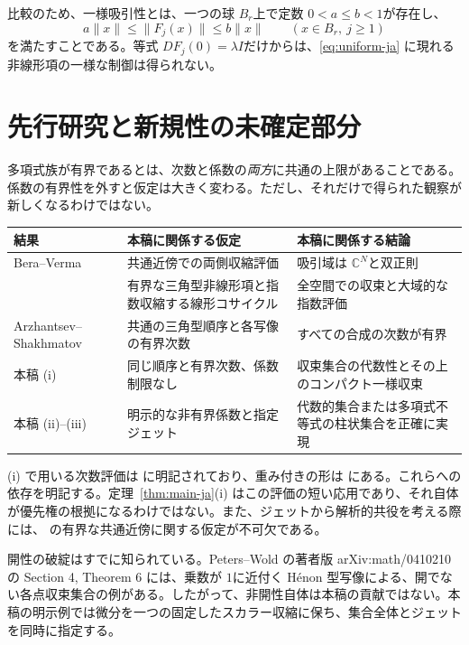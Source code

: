 \documentclass[12pt]{amsart}
\theoremstyle{definition}
\theoremstyle{remark}
\numberwithin{equation}{section}
\newcommand{\C}{\mathbb{C}}
\begin{document}
比較のため、一様吸引性とは、一つの球 \allowbreak$B_r$\allowbreak 上で定数 \allowbreak$0<a\leq b<1$\allowbreak が存在し、
\begin{equation}\label{eq:uniform-ja}
a\|x\|\leq\|F_j(x)\|\leq b\|x\|
\qquad(x\in B_r,\ j\geq1)
\end{equation}
を満たすことである。等式 \allowbreak$DF_j(0)=\lambda I$\allowbreak だけからは、\eqref{eq:uniform-ja} に現れる非線形項の一様な制御は得られない。

\section{先行研究と新規性の未確定部分}
多項式族が有界であるとは、次数と係数の\emph{両方}に共通の上限があることである。係数の有界性を外すと仮定は大きく変わる。ただし、それだけで得られた観察が新しくなるわけではない。

\begin{center}
\small
\begin{tabular}{p{2.55cm}|p{5.05cm}|p{5.4cm}}
結果 & 本稿に関係する仮定 & 本稿に関係する結論\\\hline
Bera--Verma & 共通近傍での両側収縮評価 & 吸引域は \allowbreak$\C^N$\allowbreak と双正則\\
\cite{AAM-ja} & 有界な三角型非線形項と指数収縮する線形コサイクル & 全空間での収束と大域的な指数評価\\
Arzhantsev--Shakhmatov & 共通の三角型順序と各写像の有界次数 & すべての合成の次数が有界\\
本稿 (i) & 同じ順序と有界次数、係数制限なし & 収束集合の代数性とその上のコンパクト一様収束\\
本稿 (ii)--(iii) & 明示的な非有界係数と指定ジェット & 代数的集合または多項式不等式の柱状集合を正確に実現
\end{tabular}
\end{center}

(i) で用いる次数評価は \cite[Lemma 1]{AS-ja} に明記されており、重み付きの形は \cite[Lemma 6.2]{AAM-ja} にある。これらへの依存を明記する。定理~\ref{thm:main-ja}(i) はこの評価の短い応用であり、それ自体が優先権の根拠になるわけではない。また、ジェットから解析的共役を考える際には、\cite[Theorem A.1]{AAM-ja} の有界な共通近傍に関する仮定が不可欠である。

開性の破綻はすでに知られている。Peters--Wold の著者版 arXiv:math/0410210 の Section 4, Theorem 6 \cite{PW-ja} には、乗数が \allowbreak$1$\allowbreak に近付く H\'enon 型写像による、開でない各点収束集合の例がある。したがって、非開性自体は本稿の貢献ではない。本稿の明示例では微分を一つの固定したスカラー収縮に保ち、集合全体とジェットを同時に指定する。
\end{document}
